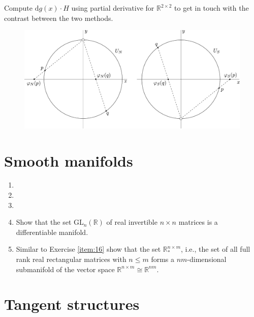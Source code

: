 \documentclass{article}
\begin{document}
\begin{enumerate}[start=9]
  Compute $\text{d}g(x)\cdot H$ using partial derivative for $\mathbb{R}^{2\times2}$ to get in touch with the contrast between the two methods.

  \begin{figure}
    \centering
    \includegraphics[scale=0.5]{assets/ex9.pdf}
  \end{figure}
  \begin{ans_box}
  \end{ans_box}
\end{enumerate}

\section{Smooth manifolds}

\begin{enumerate}[start=13]
  \item
  \item
  \item
  \item \label{item:16} Show that the set GL$_{n}(\mathbb{R})$ of real invertible $n\times n$ matrices is a differentiable manifold.

  \item Similar to Exercise \ref{item:16} show that the set $\mathbb{R}^{n\times m}_{*}$, i.e., the set of all full rank real rectangular matrices with $n\leq m$ forms a $nm$-dimensional submanifold of the vector space $\mathbb{R}^{n\times m}\cong\mathbb{R}^{nm}$.
\end{enumerate}

\section{Tangent structures}
\end{document}
